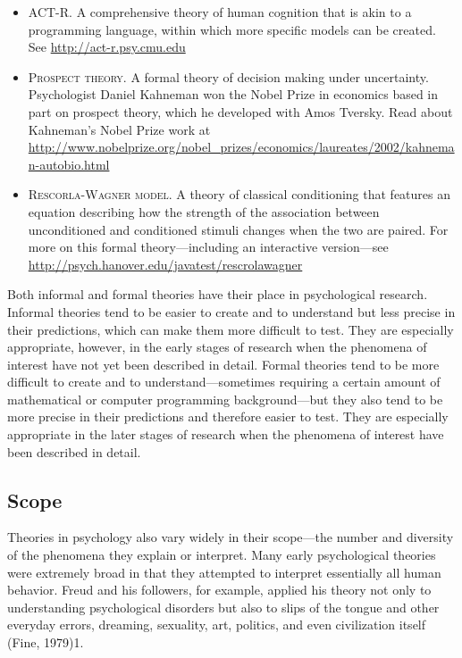 \begin{itemize}
\item \textsc{ACT-R}. A comprehensive theory of human cognition that is akin to a programming language, within which more specific models can be created. See \url{http://act-r.psy.cmu.edu}
\item \textsc{Prospect theory}. A formal theory of decision making under uncertainty. Psychologist Daniel Kahneman won the Nobel Prize in economics based in part on prospect theory, which he developed with Amos Tversky. Read about Kahneman's Nobel Prize work at \url{http://www.nobelprize.org/nobel_prizes/economics/laureates/2002/kahneman-autobio.html}
\item \textsc{Rescorla-Wagner model}. A theory of classical conditioning that features an equation describing how the strength of the association between unconditioned and conditioned stimuli changes when the two are paired. For more on this formal theory---including an interactive
version---see \url{http://psych.hanover.edu/javatest/rescrolawagner}
\end{itemize}



Both informal and formal theories have their place in psychological research. Informal theories tend to be easier to create and to understand but less precise in their predictions, which can make them more difficult to test. They are especially appropriate, however, in the early stages of research when the phenomena of interest have not yet been described in detail. Formal theories tend to be more difficult to create and to understand---sometimes requiring a certain amount of mathematical or computer programming background---but they also tend to be more precise in their predictions and therefore easier to test. They are especially appropriate in the later stages of research when the phenomena of interest have been described in detail.

\subsection{Scope}

Theories in psychology also vary widely in their scope---the number and diversity of the phenomena they explain or interpret. Many early psychological theories were extremely broad in that they attempted to interpret essentially all human behavior. Freud and his followers, for example, applied his theory not only to understanding psychological disorders but also to slips of the tongue and other everyday errors, dreaming, sexuality, art, politics, and even civilization itself (Fine, 1979)1.

